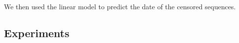 \documentclass[12pt]{article}
\begin{document}
We then used the linear model to predict the date of the censored sequences.

\subsection * {Experiments} \label{subsec:experiments}

%
%
%
\end{document}
